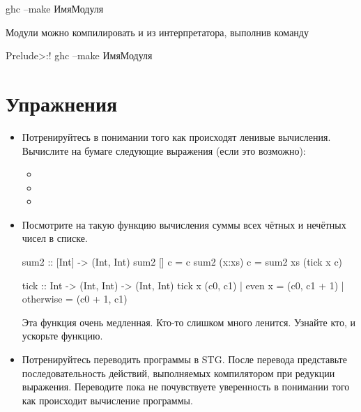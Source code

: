 \begin{code}
ghc --make ИмяМодуля
\end{code}

Модули можно компилировать и из интерпретатора, выполнив команду

\begin{code}
Prelude>:! ghc --make ИмяМодуля
\end{code}

\section{Упражнения}

\begin{itemize}

\item Потренируйтесь в понимании того как происходят
        ленивые вычисления. Вычислите на бумаге 
        следующие выражения (если это возможно):

\begin{itemize}
\item 
{}

\item {}
\item {}
\end{itemize}

\item Посмотрите на такую функцию вычисления суммы
        всех чётных и нечётных чисел в списке. 

\begin{code}
sum2 :: [Int] -> (Int, Int)
sum2 []     c = c
sum2 (x:xs) c = sum2 xs (tick x c)

tick :: Int -> (Int, Int) -> (Int, Int)
tick x (c0, c1) | even x    = (c0, c1 + 1)
                | otherwise = (c0 + 1, c1)
\end{code} 

    Эта функция очень медленная. Кто-то слишком много ленится.
    Узнайте кто, и ускорьте функцию.
   
\item Потренируйтесь переводить программы в STG.
    После перевода представьте последовательность действий,
    выполняемых компилятором при редукции выражения.
    Переводите пока не почувствуете уверенность в понимании того как 
    происходит вычисление программы.
\end{itemize}
